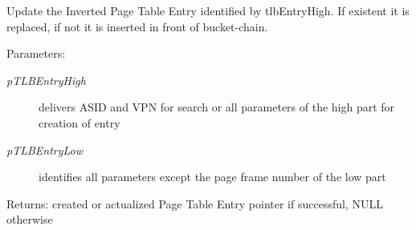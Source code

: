 Update the Inverted Page Table Entry identified by tlbEntryHigh. If existent it is replaced, if not it is inserted in front of bucket-chain. \begin{Desc}
\item[Parameters:]
\begin{description}
\item[{\em pTLBEntryHigh}]delivers ASID and VPN for search or all parameters of the high part for creation of entry \item[{\em pTLBEntryLow}]identifies all parameters except the page frame number of the low part \end{description}
\end{Desc}
\begin{Desc}
\item[Returns:]created or actualized Page Table Entry pointer if successful, NULL otherwise \end{Desc}
